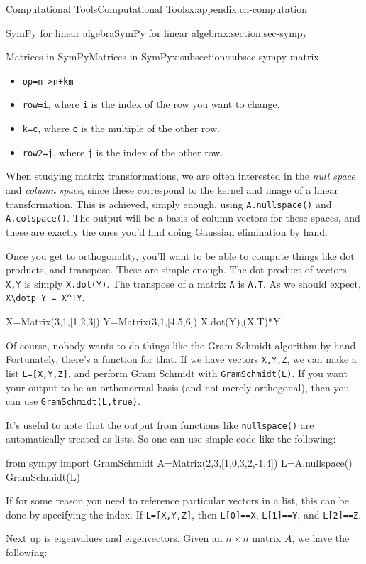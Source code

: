 \documentclass[oneside,10pt,]{book}
\newcommand{\mono}[1]{\texttt{#1}}
\numberwithin{equation}{section}
\begin{document}
\begin{appendixptx}{Computational Tools}{}{Computational Tools}{}{}{x:appendix:ch-computation}
\begin{sectionptx}{SymPy for linear algebra}{}{SymPy for linear algebra}{}{}{x:section:sec-sympy}
\begin{subsectionptx}{Matrices in SymPy}{}{Matrices in SymPy}{}{}{x:subsection:subsec-sympy-matrix}
\begin{itemize}[label=\textbullet]
\begin{itemize}[label=$\circ$]
\item{}\mono{op=\textquotesingle{}n->n+km\textquotesingle{}}%
\item{}\mono{row=i}, where \mono{i} is the index of the row you want to change.%
\item{}\mono{k=c}, where \mono{c} is the multiple of the other row.%
\item{}\mono{row2=j}, where \mono{j} is the index of the other row.%
\end{itemize}
%
\end{itemize}
%
\par
When studying matrix transformations, we are often interested in the \emph{null space} and \emph{column space}, since these correspond to the kernel and image of a linear transformation. This is achieved, simply enough, using \mono{A.nullspace()} and \mono{A.colspace()}. The output will be a basis of column vectors for these spaces, and these are exactly the ones you'd find doing Gaussian elimination by hand.%
\par
Once you get to orthogonality, you'll want to be able to compute things like dot products, and transpose. These are simple enough. The dot product of vectors \mono{X,Y} is simply \mono{X.dot(Y)}. The transpose of a matrix \mono{A} is \mono{A.T}. As we should expect, \mono{X\textbackslash{}dotp Y = X\textasciicircum{}TY}.%
\begin{sageinput}
X=Matrix(3,1,[1,2,3])
Y=Matrix(3,1,[4,5,6])
X.dot(Y),(X.T)*Y
\end{sageinput}
Of course, nobody wants to do things like the Gram Schmidt algorithm by hand. Fortunately, there's a function for that. If we have vectors \mono{X,Y,Z}, we can make a list \mono{L=[X,Y,Z]}, and perform Gram Schmidt with \mono{GramSchmidt(L)}. If you want your output to be an orthonormal basis (and not merely orthogonal), then you can use \mono{GramSchmidt(L,true)}.%
\par
It's useful to note that the output from functions like \mono{nullspace()} are automatically treated as lists. So one can use simple code like the following:%
\begin{sageinput}
from sympy import GramSchmidt
A=Matrix(2,3,[1,0,3,2,-1,4])
L=A.nullspace()
GramSchmidt(L)
\end{sageinput}
If for some reason you need to reference particular vectors in a list, this can be done by specifying the index. If \mono{L=[X,Y,Z]}, then \mono{L[0]==X}, \mono{L[1]==Y}, and \mono{L[2]==Z}.%
\par
Next up is eigenvalues and eigenvectors. Given an \(n\times n\) matrix \(A\), we have the following:%

\end{subsectionptx}
\end{sectionptx}
\end{appendixptx}
\end{document}
